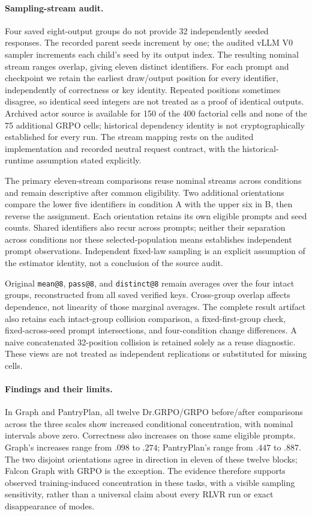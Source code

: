 \paragraph{Sampling-stream audit.}
Four saved eight-output groups do not provide 32 independently seeded
responses. The recorded parent seeds increment by one; the audited vLLM V0
sampler increments each child's seed by its output index. The resulting
nominal stream ranges overlap, giving eleven distinct identifiers. For each
prompt and checkpoint we retain the earliest draw/output position for every
identifier, independently of correctness or key identity. Repeated positions
sometimes disagree, so identical seed integers are not treated as a proof of
identical outputs. Archived actor source is available for 150 of the 400
factorial cells and none of the 75 additional GRPO cells; historical dependency
identity is not cryptographically established for every run. The stream
mapping rests on the audited implementation and recorded neutral request
contract, with the historical-runtime assumption stated explicitly.

The primary eleven-stream comparisons reuse nominal streams across conditions
and remain descriptive after common eligibility. Two additional orientations
compare the lower five identifiers in condition A with the upper six in B,
then reverse the assignment. Each orientation retains its own eligible prompts
and seed counts. Shared identifiers also recur across prompts; neither their
separation across conditions nor these selected-population means establishes
independent prompt observations. Independent fixed-law sampling is an explicit
assumption of the estimator identity, not a conclusion of the source audit.

Original \texttt{mean@8}, \texttt{pass@8}, and \texttt{distinct@8} remain averages
over the four intact groups, reconstructed from all saved verified keys.
Cross-group overlap affects dependence, not linearity of those marginal
averages. The complete result artifact also retains each intact-group
collision comparison, a fixed-first-group check, fixed-across-seed prompt
intersections, and four-condition change differences. A naive concatenated
32-position collision is retained solely as a reuse diagnostic. These views
are not treated as independent replications or substituted for missing cells.

\paragraph{Findings and their limits.}
In Graph and PantryPlan, all twelve Dr.GRPO/GRPO before/after comparisons
across the three scales show increased conditional concentration, with
nominal intervals above zero. Correctness also increases on those same
eligible prompts. Graph's increases range from $.098$ to $.274$; PantryPlan's
range from $.447$ to $.887$. The two disjoint orientations agree in direction
in eleven of these twelve blocks; Falcon Graph with GRPO is the exception.
The evidence therefore supports observed training-induced concentration in
these tasks, with a visible sampling sensitivity, rather than a universal
claim about every RLVR run or exact disappearance of modes.

